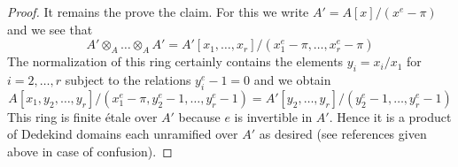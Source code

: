 \documentclass{amsart}
\theoremstyle{plain}
\theoremstyle{definition}
\theoremstyle{remark}
\numberwithin{equation}{subsection}
\begin{document}
\begin{proof}
\medskip\noindent
It remains the prove the claim. For this we write
$A' = A[x]/(x^e - \pi)$ and we see that
$$
A' \otimes_A \ldots \otimes_A A' =
A'[x_1, \ldots, x_r]/(x_1^e - \pi, \ldots, x_r^e - \pi)
$$
The normalization of this ring certainly contains the
elements $y_i = x_i/x_1$ for $i = 2, \ldots, r$ subject
to the relations $y_i^e - 1 = 0$ and
we obtain
$$
A[x_1, y_2, \ldots, y_r]/(x_1^e - \pi, y_2^e - 1, \ldots, y_r^e - 1) =
A'[y_2, \ldots, y_r]/(y_2^e - 1, \ldots, y_r^e - 1)
$$
This ring is finite \'etale over $A'$ because $e$ is invertible in $A'$.
Hence it is a product of Dedekind domains each unramified over $A'$
as desired (see references given above in case of confusion).
\end{proof}
\end{document}
